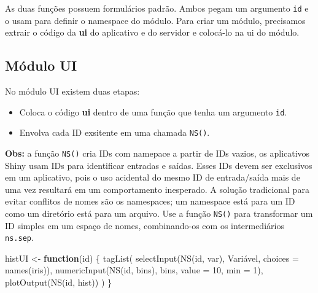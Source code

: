 \documentclass[
]{book}
\newenvironment{Shaded}{\begin{snugshade}}{\end{snugshade}}
\newcommand{\AttributeTok}[1]{\textcolor[rgb]{0.77,0.63,0.00}{#1}}
\newcommand{\ControlFlowTok}[1]{\textcolor[rgb]{0.13,0.29,0.53}{\textbf{#1}}}
\newcommand{\DecValTok}[1]{\textcolor[rgb]{0.00,0.00,0.81}{#1}}
\newcommand{\FunctionTok}[1]{\textcolor[rgb]{0.00,0.00,0.00}{#1}}
\newcommand{\NormalTok}[1]{#1}
\newcommand{\OtherTok}[1]{\textcolor[rgb]{0.56,0.35,0.01}{#1}}
\newcommand{\StringTok}[1]{\textcolor[rgb]{0.31,0.60,0.02}{#1}}
\begin{document}
As duas funções possuem formulários padrão. Ambos pegam um argumento \texttt{id} e o usam para definir o namespace do módulo. Para criar um módulo, precisamos extrair o código da \textbf{ui} do aplicativo e do servidor e colocá-lo na ui do módulo.

\hypertarget{muxf3dulo-ui}{%
\subsection{\texorpdfstring{\textbf{Módulo UI}}{Módulo UI}}\label{muxf3dulo-ui}}

No módulo UI existem duas etapas:

\begin{itemize}
\item
  Coloca o código \textbf{ui} dentro de uma função que tenha um argumento \texttt{id}.
\item
  Envolva cada ID exsitente em uma chamada \texttt{NS()}.
\end{itemize}

\textbf{Obs:} a função \texttt{NS()} cria IDs com namepace a partir de IDs vazios, os aplicativos Shiny usam IDs para identificar entradas e saídas. Esses IDs devem ser exclusivos em um aplicativo, pois o uso acidental do mesmo ID de entrada/saída mais de uma vez resultará em um comportamento inesperado. A solução tradicional para evitar conflitos de nomes são os namespaces; um namespace está para um ID como um diretório está para um arquivo. Use a função \texttt{NS()} para transformar um ID simples em um espaço de nomes, combinando-os com os intermediários \texttt{ns.sep}.

\begin{Shaded}
\begin{Highlighting}[]
\NormalTok{histUI }\OtherTok{\textless{}{-}} \ControlFlowTok{function}\NormalTok{(id) \{}
  \FunctionTok{tagList}\NormalTok{(}
    \FunctionTok{selectInput}\NormalTok{(}\FunctionTok{NS}\NormalTok{(id, }\StringTok{\textquotesingle{}var\textquotesingle{}}\NormalTok{), }\StringTok{\textquotesingle{}Variável\textquotesingle{}}\NormalTok{, }\AttributeTok{choices =} \FunctionTok{names}\NormalTok{(iris)),}
    \FunctionTok{numericInput}\NormalTok{(}\FunctionTok{NS}\NormalTok{(id, }\StringTok{\textquotesingle{}bins\textquotesingle{}}\NormalTok{), }\StringTok{\textquotesingle{}bins\textquotesingle{}}\NormalTok{, }\AttributeTok{value =} \DecValTok{10}\NormalTok{, }\AttributeTok{min =} \DecValTok{1}\NormalTok{),}
    \FunctionTok{plotOutput}\NormalTok{(}\FunctionTok{NS}\NormalTok{(id, }\StringTok{\textquotesingle{}hist\textquotesingle{}}\NormalTok{))}
\NormalTok{  )}
\NormalTok{\}}
\end{Highlighting}
\end{Shaded}
\end{document}
